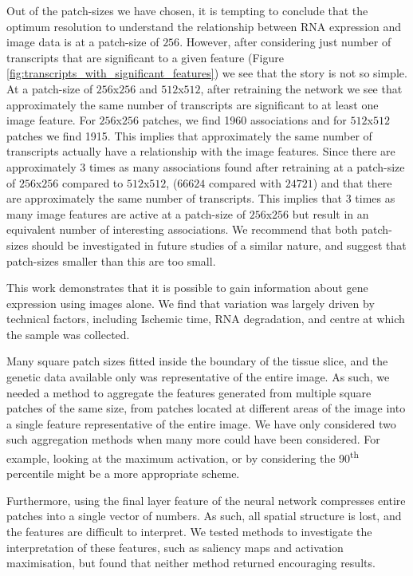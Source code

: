 \documentclass[graybox]{svmult}
\begin{document}
Out of the patch-sizes we have chosen, it is tempting to conclude that the optimum resolution to understand the relationship between RNA expression and image data is at a patch-size of $256$. However, after considering just number of transcripts that are significant to a given feature (Figure \ref{fig:transcripts_with_significant_features}) we see that the story is not so simple. At a patch-size of $256$x$256$ and $512$x$512$, after retraining the network we see that approximately the same number of transcripts are significant to at least one image feature. For $256$x$256$ patches, we find 1960 associations and for $512$x$512$ patches we find 1915. This implies that approximately the same number of transcripts actually have a relationship with the image features. Since there are approximately $3$ times as many associations found after retraining at a patch-size of $256$x$256$ compared to $512$x$512$, ($66624$ compared with $24721$) and that there are approximately the same number of transcripts. This implies that $3$ times as many image features are active at a patch-size of $256$x$256$ but result in an equivalent number of interesting associations. We recommend that both patch-sizes should be investigated in future studies of a similar nature, and suggest that patch-sizes smaller than this are too small.

This work demonstrates that it is possible to gain information about gene expression using images alone. We find that variation was largely driven by technical factors, including Ischemic time, RNA degradation, and centre at which the sample was collected. 

Many square patch sizes fitted inside the boundary of the tissue slice, and the genetic data available only was representative of the entire image. As such, we needed a method to aggregate the features generated from multiple square patches of the same size, from patches located at different areas of the image into a single feature representative of the entire image. We have only considered two such aggregation methods when many more could have been considered. For example, looking at the maximum activation, or by considering the 90\textsuperscript{th} percentile might be a more appropriate scheme.

Furthermore, using the final layer feature of the neural network compresses entire patches into a single vector of numbers. As such, all spatial structure is lost, and the features are difficult to interpret. We tested methods to investigate the interpretation of these features, such as saliency maps and activation maximisation, but found that neither method returned encouraging results.
\end{document}
